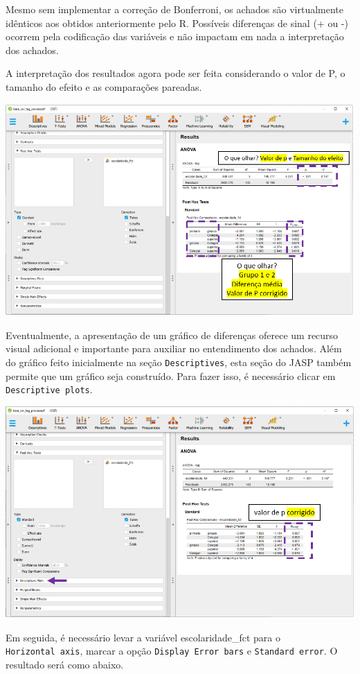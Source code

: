 \documentclass[
]{book}
\begin{document}
Mesmo sem implementar a correção de Bonferroni, os achados são
virtualmente idênticos aos obtidos anteriormente pelo R. Possíveis
diferenças de sinal (+ ou -) ocorrem pela codificação das variáveis e
não impactam em nada a interpretação dos achados.

A interpretação dos resultados agora pode ser feita considerando o valor
de P, o tamanho do efeito e as comparações pareadas.

\includegraphics{./img/cap_anova_posthoc_resultados2.png}

Eventualmente, a apresentação de um gráfico de diferenças oferece um
recurso visual adicional e importante para auxiliar no entendimento dos
achados. Além do gráfico feito inicialmente na seção
\texttt{Descriptives}, esta seção do JASP também permite que um gráfico
seja construído. Para fazer isso, é necessário clicar em
\texttt{Descriptive\ plots}.

\includegraphics{./img/cap_anova_posthoc_plots.png}

Em seguida, é necessário levar a variável escolaridade\_fct para o
\texttt{Horizontal\ axis}, marcar a opção \texttt{Display\ Error\ bars}
e \texttt{Standard\ error}. O resultado será como abaixo.
\end{document}
